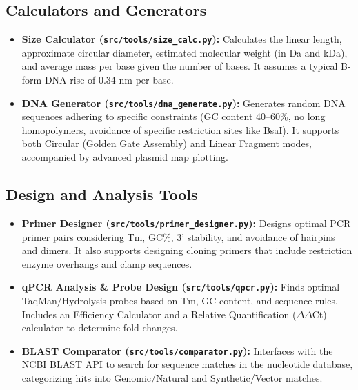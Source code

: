 \documentclass[12pt]{article}
\begin{document}
\subsection{Calculators and Generators}
\begin{itemize}
    \item \textbf{Size Calculator (\texttt{src/tools/size\_calc.py}):} Calculates the linear length, approximate circular diameter, estimated molecular weight (in Da and kDa), and average mass per base given the number of bases. It assumes a typical B-form DNA rise of 0.34 nm per base.
    \item \textbf{DNA Generator (\texttt{src/tools/dna\_generate.py}):} Generates random DNA sequences adhering to specific constraints (GC content 40--60\%, no long homopolymers, avoidance of specific restriction sites like BsaI). It supports both Circular (Golden Gate Assembly) and Linear Fragment modes, accompanied by advanced plasmid map plotting.
\end{itemize}

\subsection{Design and Analysis Tools}
\begin{itemize}
    \item \textbf{Primer Designer (\texttt{src/tools/primer\_designer.py}):} Designs optimal PCR primer pairs considering Tm, GC\%, 3' stability, and avoidance of hairpins and dimers. It also supports designing cloning primers that include restriction enzyme overhangs and clamp sequences.
    \item \textbf{qPCR Analysis \& Probe Design (\texttt{src/tools/qpcr.py}):} Finds optimal TaqMan/Hydrolysis probes based on Tm, GC content, and sequence rules. Includes an Efficiency Calculator and a Relative Quantification ($\Delta\Delta$Ct) calculator to determine fold changes.
    \item \textbf{BLAST Comparator (\texttt{src/tools/comparator.py}):} Interfaces with the NCBI BLAST API to search for sequence matches in the nucleotide database, categorizing hits into Genomic/Natural and Synthetic/Vector matches.
\end{itemize}
\end{document}
